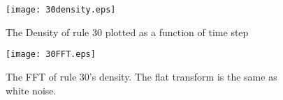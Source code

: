\begin{figure}
 \begin{minipage}[b]{0.49\textwidth}
  \centering
  \texttt{[image: 30density.eps]}
  \caption{\label{30density} The Density of rule 30 plotted as a function of time step}
 \end{minipage}
 \hspace{0.5cm}
 \begin{minipage}[b]{0.49\textwidth}
  \centering
  \texttt{[image: 30FFT.eps]}
  \caption{\label{30FFT} The FFT of rule 30's density.  The flat transform is the same as white noise.}
 \end{minipage}
\end{figure}



